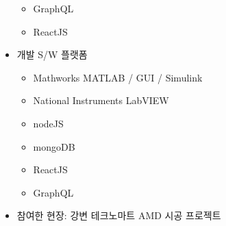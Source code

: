 \documentclass[10pt,a4paper,ragged2e]{altacv}
\begin{document}
\begin{fullwidth}
\begin{itemize}
\begin{itemize}
    \item GraphQL
    \item ReactJS
   \end{itemize}
\item 개발 S/W 플랫폼
  \begin{itemize}
    \item Mathworks MATLAB / GUI / Simulink
    \item National Instruments LabVIEW
    \item nodeJS
    \item mongoDB
    \item ReactJS
    \item GraphQL
  \end{itemize}
\item 참여한 현장: 강변 테크노마트 AMD 시공 프로젝트
\end{itemize}

\end{fullwidth}
\end{document}
